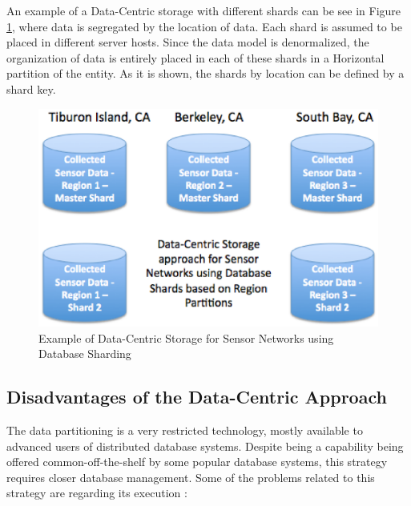 An example of a Data-Centric storage with different shards
\cite{db-shard-intro} can be see in Figure
\ref{fig:database-sharding-by-region}, where data is segregated by the
location of data. Each shard is assumed to be placed in different server hosts.
Since the data model is denormalized, the organization of data is entirely
placed in each of these shards in a Horizontal partition of the entity. As it is
shown, the shards by location can be defined by a shard key.

\begin{figure}
  \centering
  \includegraphics[scale=0.65]{../diagrams/database-sharding-by-region}
  \caption{Example of Data-Centric Storage for Sensor Networks using Database
  Sharding}
  \label{fig:database-sharding-by-region}
\end{figure}

\subsection{Disadvantages of the Data-Centric Approach}

The data partitioning is a very restricted technology, mostly available to
advanced users of distributed database systems. Despite being a capability
being offered common-off-the-shelf by some popular database systems, this
strategy requires closer database management. Some of the problems related to
this strategy are regarding its execution \cite{db-shard-discussion}:

